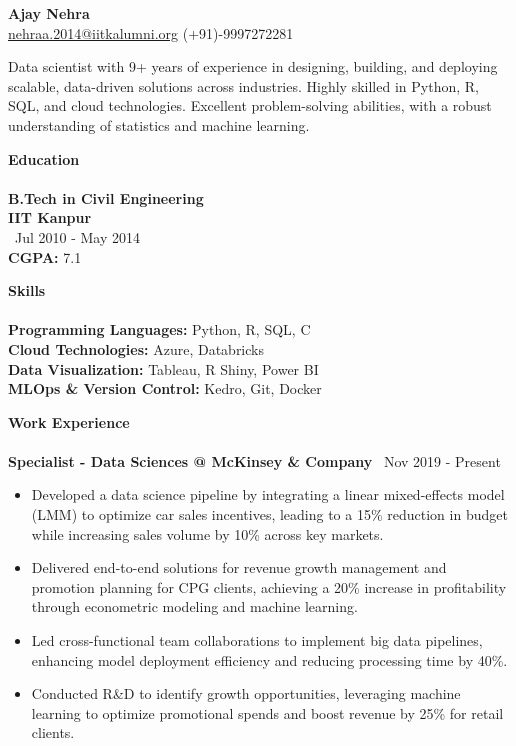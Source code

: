 \documentclass[a4paper,10pt]{article}
\newcommand{\sectionheader}[1]{%
    \textbf{\LARGE #1}\\[-0.5ex]
    \textbf{\LARGE \underline{\hspace{\textwidth}}}\\[2ex]
}
\newcommand{\columnsectionheader}[1]{%
    \textbf{\LARGE #1}\\[-0.5ex]
    \textbf{\LARGE \underline{\hspace{0.45\textwidth}}}\\[2ex]
}
\newcommand{\companyheader}[2]{%
    \vspace{1ex}
    \textbf{\large #1} \hfill \faCalendar \, #2
    \vspace{0.5ex}
}
\begin{document}
\begin{center}
    \textbf{\LARGE Ajay Nehra} \\
    \vspace{1mm}
    \href{mailto:nehraa.2014@iitkalumni.org}{nehraa.2014@iitkalumni.org} \hspace{5mm} (+91)-9997272281
\end{center}

\vspace{4mm}

Data scientist with 9+ years of experience in designing, building, and deploying scalable, data-driven solutions across industries. Highly skilled in Python, R, SQL, and cloud technologies. Excellent problem-solving abilities, with a robust understanding of statistics and machine learning.

\vspace{4mm}

\begin{multicols}{2}

\columnsectionheader{Education}
\textbf{B.Tech in Civil Engineering} \\
\textbf{IIT Kanpur} \\
\faCalendar \, Jul 2010 - May 2014 \\
\textbf{CGPA:} 7.1

\columnbreak

\columnsectionheader{Skills}
\textbf{Programming Languages:} Python, R, SQL, C \\
\textbf{Cloud Technologies:} Azure, Databricks \\
\textbf{Data Visualization:} Tableau, R Shiny, Power BI \\
\textbf{MLOps \& Version Control:} Kedro, Git, Docker

\end{multicols}

\vspace{4mm}

\sectionheader{Work Experience}

\companyheader{Specialist - Data Sciences @ McKinsey \& Company}{Nov 2019 - Present}
\begin{itemize}
    \item Developed a data science pipeline by integrating a linear mixed-effects model (LMM) to optimize car sales incentives, leading to a 15\% reduction in budget while increasing sales volume by 10\% across key markets.
    \item Delivered end-to-end solutions for revenue growth management and promotion planning for CPG clients, achieving a 20\% increase in profitability through econometric modeling and machine learning.
    \item Led cross-functional team collaborations to implement big data pipelines, enhancing model deployment efficiency and reducing processing time by 40\%.
    \item Conducted R\&D to identify growth opportunities, leveraging machine learning to optimize promotional spends and boost revenue by 25\% for retail clients.
\end{itemize}
\end{document}
